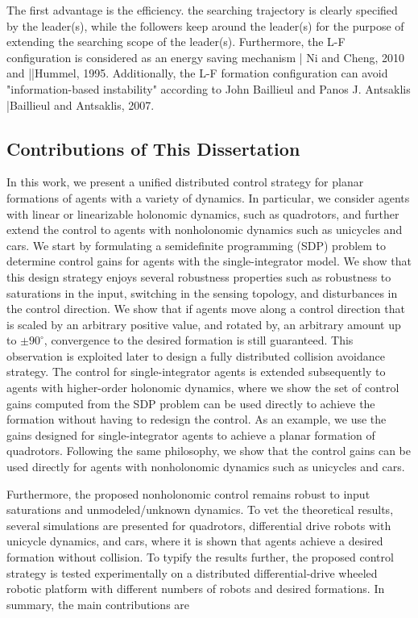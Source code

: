 \documentclass[10pt]{article}
\begin{document}
The first advantage is the efficiency. the searching trajectory is clearly specified by the leader(s), while the followers keep around the leader(s) for the purpose of extending the searching scope of the leader(s). Furthermore, the L-F configuration is considered as an energy saving mechanism | Ni and Cheng, 2010 and ||Hummel, 1995. Additionally, the L-F formation configuration can avoid "information-based instability" according to John Baillieul and Panos J. Antsaklis |Baillieul and Antsaklis, 2007.

\subsection{Contributions of This Dissertation}
In this work, we present a unified distributed control strategy for planar formations of agents with a variety of dynamics. In particular, we consider agents with linear or linearizable holonomic dynamics, such as quadrotors, and further extend the control to agents with nonholonomic dynamics such as unicycles and cars. We start by formulating a semidefinite programming (SDP) problem to determine control gains for agents with the single-integrator model. We show that this design strategy enjoys several robustness properties such as robustness to saturations in the input, switching in the sensing topology, and disturbances in the control direction. We show that if agents move along a control direction that is scaled by an arbitrary positive value, and rotated by, an arbitrary amount up to $\pm 90^{\circ}$, convergence to the desired formation is still guaranteed. This observation is exploited later to design a fully distributed collision avoidance strategy. The control for single-integrator agents is extended subsequently to agents with higher-order holonomic dynamics, where we show the set of control gains computed from the SDP problem can be used directly to achieve the formation without having to redesign the control. As an example, we use the gains designed for single-integrator agents to achieve a planar formation of quadrotors. Following the same philosophy, we show that the control gains can be used directly for agents with nonholonomic dynamics such as unicycles and cars.

Furthermore, the proposed nonholonomic control remains robust to input saturations and unmodeled/unknown dynamics. To vet the theoretical results, several simulations are presented for quadrotors, differential drive robots with unicycle dynamics, and cars, where it is shown that agents achieve a desired formation without collision. To typify the results further, the proposed control strategy is tested experimentally on a distributed differential-drive wheeled robotic platform with different numbers of robots and desired formations. In summary, the main contributions are
\end{document}
